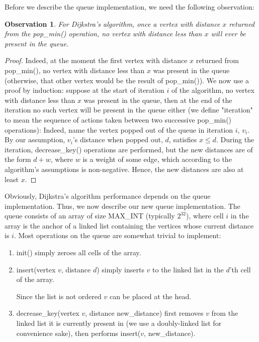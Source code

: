 \documentclass[conference,10pt,twocolumn]{IEEEtran}
\newtheorem{obsrv}{Observation}
\begin{document}
Before we describe the queue implementation, we need the following observation:

\begin{obsrv}
\label{non-decreasing}
For Dijkstra's algorithm, once a vertex with distance $x$ returned from the pop\_min() operation, no vertex with distance less than $x$ will ever be present in the queue.
\end{obsrv}

\begin{proof}
Indeed, at the moment the first vertex with distance $x$ returned from pop\_min(), no vertex with distance less than $x$ was present in the queue (otherwise, that other vertex would be the result of pop\_min()).
We now use a proof by induction: suppose at the start of iteration $i$ of the algorithm, no vertex with distance less than $x$ was present in the queue, then at the end of the iteration no such vertex will be present in the queue either (we define "iteration" to mean the sequence of actions taken between two successive pop\_min() operations):
Indeed, name the vertex popped out of the queue in iteration $i$, $v_i$. By our assumption, $v_i$'s distance when popped out, $d$, satisfies $x \le d$. During the iteration, decrease\_key() operations are performed, but the new distances are of the form $d + w$, where $w$ is a weight of some edge, which according to the algorithm's assumptions is non-negative. Hence, the new distances are also at least $x$.
\end{proof}

Obviously, Dijkstra's algorithm performance depends on the queue implementation.  Thus, we now describe our new queue implementation. The queue consists of an array of size MAX\_INT (typically $2^{32}$), where cell $i$ in the array is the anchor of a linked list containing the vertices whose current distance is $i$. Most operations on the queue are somewhat trivial to implement:

\begin{enumerate}

\item init() simply zeroes all cells of the array.

\item insert(vertex $v$, distance $d$) simply inserts $v$ to the linked list in the $d$'th cell of the array.  

Since the list is not ordered $v$ can be placed at the head.

\item decrease\_key(vertex $v$, distance new\_distance) first removes $v$ from the linked list it is currently present in (we use a doubly-linked list for convenience sake), then performs insert($v$, new\_distance).

\end{enumerate}
\end{document}
